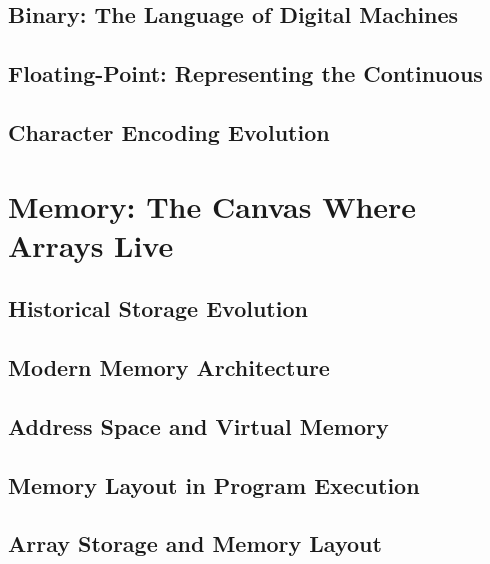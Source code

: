 \documentclass[12pt, oneside, openany]{book}
\begin{document}
\section{Binary: The Language of Digital Machines}
\section{Floating-Point: Representing the Continuous}
\section{Character Encoding Evolution}


\chapter{Memory: The Canvas Where Arrays Live}

\section{Historical Storage Evolution}
\section{Modern Memory Architecture}
\section{Address Space and Virtual Memory}
\section{Memory Layout in Program Execution}
\section{Array Storage and Memory Layout}
	
\end{document}
